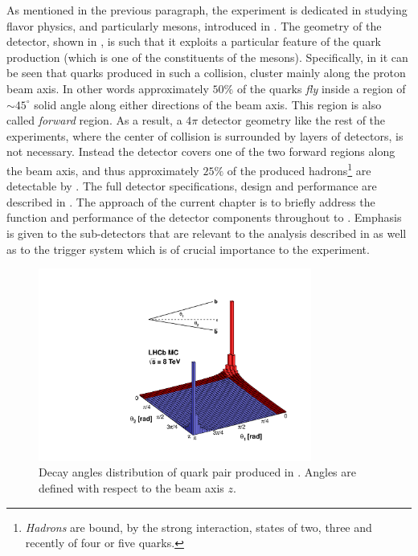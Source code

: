 As mentioned in the previous paragraph, the \lhcb experiment is dedicated in studying flavor physics,
and particularly \B mesons, introduced in . The geometry of the \lhcb detector,
shown in , is such that it exploits a particular feature of the
\bquark quark production (which is one of the constituents of the \B mesons). Specifically, in 
it can be seen that \bquark quarks produced in such a collision, cluster mainly along the proton beam axis.
In other words approximately $50\%$ of the \bquark quarks {\it fly} inside a region of $\sim 45^\circ$ solid
angle along either directions of the beam axis. This region is also called {\it forward} region.
As a result, a $4\pi$ detector geometry like the rest of the \lhc experiments, where the center of collision
is surrounded by layers of detectors, is not necessary. Instead the \lhcb detector covers one of the two
forward regions along the beam axis, and thus approximately $25\%$ of the produced \bquark
hadrons\footnote{ {\it Hadrons} are bound, by the strong interaction, states of two,
three and recently \cite{Aaij:2016nsc} of four or five quarks.} are detectable by \lhcb.
The full \lhcb detector specifications, design and performance are described in \cite{Aaij:2014jba}.
The approach of the current chapter is to briefly address the function and performance of the detector components
throughout  to . Emphasis is given to the sub-detectors that are relevant
to the analysis described in  as well as to the trigger system which is of crucial importance
to the \lhcb experiment.

\begin{figure}[t]
  \centering
  \includegraphics[width=0.8\textwidth, trim=0cm 0cm 0cm 2.5cm, clip=true]{Figures/Chapter2/08_rad_acc_scheme_right}
  \caption{Decay angles distribution of \bquark quark pair produced in \lhcb. Angles are defined with
           respect to the beam axis $z$.}
  \label{bb_roduction_angles}
\end{figure}
